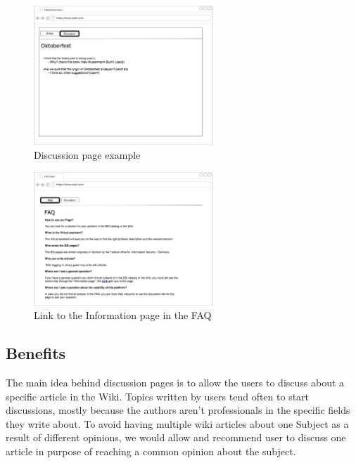  \begin{figure}[h!] 
    \centering
    \includegraphics[width=0.6\textwidth]{Pictures/discussion1.jpg}
    \caption{Discussion page example}
\end{figure} 

 \begin{figure}[h!] 
    \centering
    \includegraphics[width=0.6\textwidth]{Pictures/information1.jpg}
    \caption{Link to the Information page in the FAQ}
\end{figure} 

\subsection{Benefits}
The main idea behind discussion pages is to allow the users to discuss about a specific article in the Wiki.
Topics written by users tend often to start discussions, mostly because the authors aren’t professionals in the specific fields they write about. To avoid having multiple wiki articles about one Subject as a result of different opinions, we would allow and recommend user to discuss one article in purpose of reaching a common opinion about the subject.

